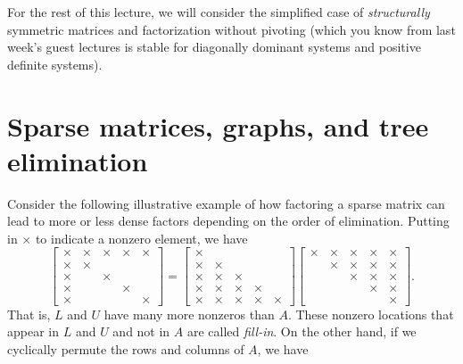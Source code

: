 \documentclass[12pt, leqno]{article} %
\begin{document}
For the rest of this lecture, we will consider the simplified case of
{\em structurally} symmetric matrices and factorization without
pivoting (which you know from last week's guest lectures is stable for
diagonally dominant systems and positive definite systems).

\section{Sparse matrices, graphs, and tree elimination}

Consider the following illustrative example of how factoring a sparse
matrix can lead to more or less dense factors depending on the order
of elimination.  Putting in $\times$ to indicate a nonzero element, we
have
\[
  \begin{bmatrix}
    \times & \times & \times & \times & \times \\
    \times & \times &        &        &        \\
    \times &        & \times &        &        \\
    \times &        &        & \times &        \\
    \times &        &        &        & \times
  \end{bmatrix} =
  \begin{bmatrix}
    \times &        &        &        &        \\
    \times & \times &        &        &        \\
    \times & \times & \times &        &        \\
    \times & \times & \times & \times &        \\
    \times & \times & \times & \times & \times
  \end{bmatrix}
  \begin{bmatrix}
    \times & \times & \times & \times & \times \\
           & \times & \times & \times & \times \\
           &        & \times & \times & \times \\
           &        &        & \times & \times \\
           &        &        &        & \times
  \end{bmatrix}.
\]
That is, $L$ and $U$ have many more nonzeros than $A$.
These nonzero locations that appear in $L$ and $U$ and not in $A$
are called {\em fill-in}.  On the other hand, if we cyclically
permute the rows and columns of $A$, we have
\end{document}
